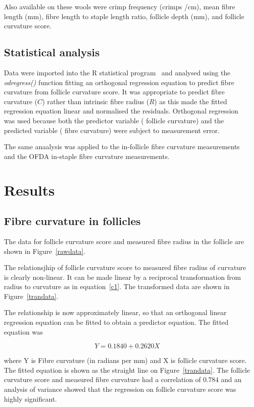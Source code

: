\documentclass[titlepage]{article}  %
\begin{document}
Also available on these wools were crimp frequency (crimps /cm), mean fibre length (mm), fibre length to staple length ratio, follicle depth (mm), and follicle curvature score.

\subsection{Statistical analysis}
 Data were imported into the R statistical program~\cite{rprog:13} and analysed using the {\em odregress()} function fitting an orthogonal regression equation to predict fibre curvature from follicle curvature score. It was appropriate to predict fibre curvature ($C$) rather than intrinsic fibre radius ($R$) as this made the fitted regression equation linear and normalised the residuals. Orthogonal regression was used because both the predictor variable ( follicle curvature) and the predicted variable ( fibre curvature) were subject to measurement error.

The same anaalysis was applied to the in-follicle fibre curvature measurements and the OFDA in-staple fibre curvature measurements.


\section{Results}
\subsection{Fibre curvature in follicles}
The data for follicle curvature score and measured fibre radius in the follicle are shown in Figure~\ref{rawdata}.



The relationsjhip of follicle curvature score to measured fibre radius of curvature is clearly non-linear. It can be made linear by a reciprocal transformation from radius to curvature as in equation~\ref{c1}. The transformed data are shown in Figure~\ref{trandata}.



 The relationship is now approximately linear, so that an orthogonal linear regression equation can be fitted to obtain a predictor equation. The fitted equation was

\begin{equation}
\label{eqn:in-follicle}
Y = 0.1840 + 0.2620 X
\end{equation}

where Y is Fibre curvature (in radians per mm) and X is follicle curvature score. The fitted equation is shown as the straight line on Figure~\ref{trandata}.
The follicle curvature score and measured fibre curvature  had a correlation  of $0.784$ and an analysis of variance showed that the regression on follicle curvature score was highly significant.
\end{document}
